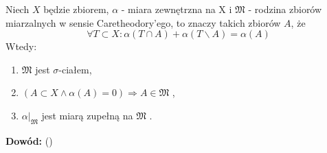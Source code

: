 \begin{tw}
	Niech $X$ będzie zbiorem, $\alpha$ - miara zewnętrzna na X i $\mathfrak{M}$ - rodzina zbiorów miarzalnych w sensie Caretheodory'ego, to znaczy takich zbiorów $A$, że 
	$$
	\forall T \subset X: \alpha(T \cap A)  + \alpha(T \backslash A) = \alpha(A)
	$$
	Wtedy:
	\begin{enumerate}	
		\item $\mathfrak{M}$ jest $\sigma$-ciałem,
		\item $(A \subset X \wedge \alpha(A) = 0) \Longrightarrow A \in \mathfrak{M}$ ,
		\item $\alpha|_{\mathfrak{M}}$ jest miarą zupełną na $\mathfrak{M}$ .
	\end{enumerate}
	\textbf{Dowód:} (\citep[2.30]{Tworzewski}) 
\end{tw}